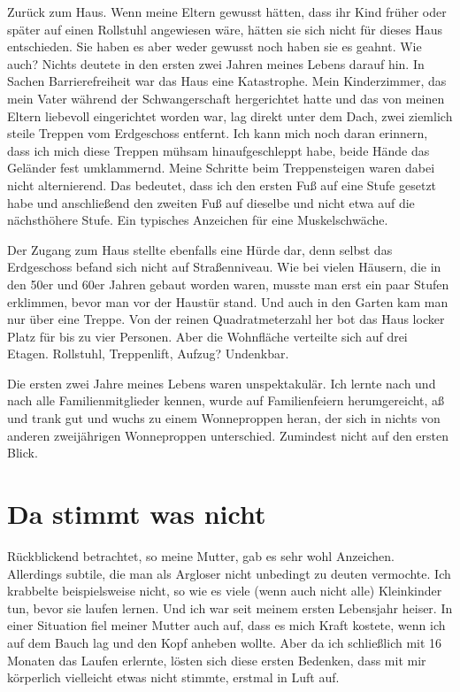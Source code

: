 \documentclass[fontsize=12pt,a4paper,headinclude,DIV=calc,automark]{scrbook}
\begin{document}
Zurück zum Haus. Wenn meine Eltern gewusst hätten, dass ihr Kind früher oder später auf einen Rollstuhl angewiesen wäre, hätten sie sich nicht für dieses Haus entschieden. Sie haben es aber weder gewusst noch haben sie es geahnt. Wie auch? Nichts deutete in den ersten zwei Jahren meines Lebens darauf hin. In Sachen Barrierefreiheit war das Haus eine Katastrophe. Mein Kinderzimmer, das mein Vater während der Schwangerschaft hergerichtet hatte und das von meinen Eltern liebevoll eingerichtet worden war, lag direkt unter dem Dach, zwei ziemlich steile Treppen vom Erdgeschoss entfernt. Ich kann mich noch daran erinnern, dass ich mich diese Treppen mühsam hinaufgeschleppt habe, beide Hände das Geländer fest umklammernd. Meine Schritte beim Treppensteigen waren dabei nicht alternierend. Das bedeutet, dass ich den ersten Fuß auf eine Stufe gesetzt habe und anschließend den zweiten Fuß auf dieselbe und nicht etwa auf die nächsthöhere Stufe. Ein typisches Anzeichen für eine Muskelschwäche.

Der Zugang zum Haus stellte ebenfalls eine Hürde dar, denn selbst das Erdgeschoss befand sich nicht auf Straßenniveau. Wie bei vielen Häusern, die in den 50er und 60er Jahren gebaut worden waren, musste man erst ein paar Stufen erklimmen, bevor man vor der Haustür stand. Und auch in den Garten kam man nur über eine Treppe. Von der reinen Quadratmeterzahl her bot das Haus locker Platz für bis zu vier Personen. Aber die Wohnfläche verteilte sich auf drei Etagen. Rollstuhl, Treppenlift, Aufzug? Undenkbar.

Die ersten zwei Jahre meines Lebens waren unspektakulär. Ich lernte nach und nach alle Familienmitglieder kennen, wurde auf Familienfeiern herumgereicht, aß und trank gut und wuchs zu einem Wonneproppen heran, der sich in nichts von anderen zweijährigen Wonneproppen unterschied.
Zumindest nicht auf den ersten Blick.

\section{Da stimmt was nicht}
Rückblickend betrachtet, so meine Mutter, gab es sehr wohl Anzeichen. Allerdings subtile, die man als Argloser nicht unbedingt zu deuten vermochte. Ich krabbelte beispielsweise nicht, so wie es viele (wenn auch nicht alle) Kleinkinder tun, bevor sie laufen lernen. Und ich war seit meinem ersten Lebensjahr heiser. In einer Situation fiel meiner Mutter auch auf, dass es mich Kraft kostete, wenn ich auf dem Bauch lag und den Kopf anheben wollte. Aber da ich schließlich mit 16 Monaten das Laufen erlernte, lösten sich diese ersten Bedenken, dass mit mir körperlich vielleicht etwas nicht stimmte, erstmal in Luft auf.
\end{document}
